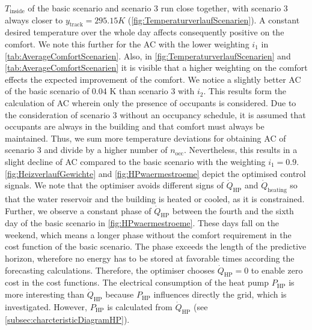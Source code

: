 $T_\text{inside}$ of the basic scenario and scenario 3 run close together, with scenario 3 always closer to $y_\text{track} = 295.15 K$ (\autoref{fig:TemperaturverlaufScenarien}). A constant desired temperature over the whole day affects consequently positive on the comfort. We note this further for the AC with the lower weighting $i_\text{1}$ in \autoref{tab:AverageComfortScenarien}. Also, in \autoref{fig:TemperaturverlaufScenarien} and \autoref{tab:AverageComfortScenarien} it is visible that a higher weighting on the comfort effects the expected improvement of the comfort. We notice a slightly better AC of the basic scenario of 0.04 K than scenario 3 with $i_\text{2}$. This results form the calculation of AC wherein only the presence of occupants is considered. Due to the consideration of scenario 3 without an occupancy schedule, it is assumed that occupants are always in the building and that comfort must always be maintained. Thus, we sum more temperature deviations for obtaining AC of scenario 3 and divide by a higher number of $n_\text{occ}$. Nevertheless, this results in a slight decline of AC compared to the basic scenario with the weighting $i_\text{1} = 0.9$. \newline 
\autoref{fig:HeizverlaufGewichte} and \autoref{fig:HPwaermestroeme} depict the optimised control signals. We note that the optimiser avoids different signs of $\dot{Q}_\text{HP}$ and $\dot{Q}_\text{heating}$ so that the water reservoir and the building is heated or cooled, as it is constrained. Further, we observe a constant phase of $\dot{Q}_\text{HP}$ between the fourth and the sixth day of the basic scenario in \autoref{fig:HPwaermestroeme}. These days fall on the weekend, which means a longer phase without the comfort requirement in the cost function of the basic scenario. The phase exceeds the length of the predictive horizon, wherefore no energy has to be stored at favorable times according the forecasting calculations. Therefore, the optimiser chooses $\dot{Q}_\text{HP} = 0$ to enable zero cost in the cost functions.\newline
The electrical consumption of the heat pump $P_\text{HP}$ is more interesting than $\dot{Q}_\text{HP}$ because $P_\text{HP}$ influences directly the grid, which is investigated. However, $P_\text{HP}$ is calculated from $\dot{Q}_\text{HP}$ (see \autoref{subsec:charcteristicDiagramHP}).\newline
